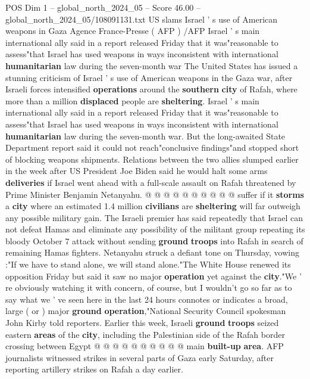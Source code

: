 \begin{textsample}{POS Dim 1 – global\_north\_2024\_05 – Score 46.00 – global\_north\_2024\_05/108091131.txt}  \label{ex:f1_pos_273}
US slams Israel ' s use of American weapons in Gaza Agence France-Presse ( AFP ) /AFP Israel ' s main international ally said in a report released Friday that it was"reasonable to assess"that Israel has used weapons in ways inconsistent with international \textbf{humanitarian} law during the seven-month war The United States has issued a stunning criticism of Israel ' s use of American weapons in the Gaza war, after Israeli forces intensified \textbf{operations} around the \textbf{southern} \textbf{city} of Rafah, where more than a million \textbf{displaced} people are \textbf{sheltering}.
Israel ' s main international ally said in a report released Friday that it was"reasonable to assess"that Israel has used weapons in ways inconsistent with international \textbf{humanitarian} law during the seven-month war.
But the long-awaited State Department report said it could not reach"conclusive findings"and stopped short of blocking weapons shipments.
Relations between the two allies slumped earlier in the week after US President Joe Biden said he would halt some arms \textbf{deliveries} if Israel went ahead with a full-scale assault on Rafah threatened by Prime Minister Benjamin Netanyahu. @ @ @ @ @ @ @ @ @ @ suffer if it \textbf{storms} a \textbf{city} where an estimated 1.4 million \textbf{civilians} are \textbf{sheltering} will far outweigh any possible military gain.
The Israeli premier has said repeatedly that Israel can not defeat Hamas and eliminate any possibility of the militant group repeating its bloody October 7 attack without sending \textbf{ground} \textbf{troops} into Rafah in search of remaining Hamas fighters.
Netanyahu struck a defiant tone on Thursday, vowing :"If we have to stand alone, we will stand alone."The White House renewed its opposition Friday but said it saw no major \textbf{operation} yet against the \textbf{city}."We ' re obviously watching it with concern, of course, but I wouldn't go so far as to say what we ' ve seen here in the last 24 hours connotes or indicates a broad, large ( or ) major \textbf{ground} \textbf{operation},"National Security Council spokesman John Kirby told reporters.
Earlier this week, Israeli \textbf{ground} \textbf{troops} seized eastern \textbf{areas} of the \textbf{city}, including the Palestinian side of the Rafah border crossing between Egypt @ @ @ @ @ @ @ @ @ @ main \textbf{built-up} \textbf{area}.
AFP journalists witnessed strikes in several parts of Gaza early Saturday, after reporting artillery strikes on Rafah a day earlier.

\end{textsample}
